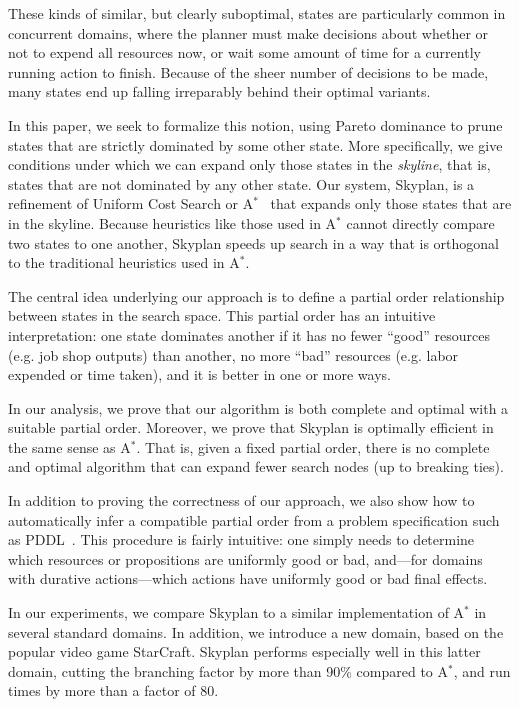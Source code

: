 \documentclass[letterpaper]{article}
\theoremstyle{plain} \newtheorem{theorem}{Theorem} \newtheorem{proposition}{Proposition} \newtheorem{lemma}{Lemma}
\theoremstyle{definition} \newtheorem{definition}{Definition} \newtheorem{conjecture}{Conjecture} \newtheorem*{example}{Example}
\theoremstyle{remark} \newtheorem*{remark}{Remark} \newtheorem*{note}{Note} \newtheorem{case}{Case}
\newcommand{\Astar}{A$^*$ }
\newcommand{\Astarpunct}{A$^*$}
\begin{document}
These kinds of similar, but clearly suboptimal, states are particularly
common in concurrent domains, where the planner must make decisions
about whether or not to expend all resources now, or wait some
amount of time for a currently running action to finish. Because
of the sheer number of decisions to be made, many states
end up falling irreparably behind their optimal variants.

In this paper, we seek to formalize this notion, using Pareto
dominance to prune states that are strictly dominated by some other
state. More specifically, we give conditions under which we can
expand only those states in the \textit{skyline}, that is, states
that are not dominated by any other state. Our system, Skyplan,
is a refinement of Uniform Cost Search or \Astarpunct~\citep{astar} that
expands only those states that are in the skyline. Because heuristics like
those used in \Astar cannot directly compare two states to one another, Skyplan
speeds up search in a way that is orthogonal to the traditional heuristics used in \Astarpunct.

The central idea underlying our approach is to define a partial
order relationship between states in the search space. This partial
order has an intuitive interpretation: one state dominates another
if it has no fewer ``good'' resources (e.g. job shop outputs) than
another, no more ``bad'' resources (e.g. labor expended or time
taken), and it is better in one or more ways. 

In our analysis, we prove that our algorithm is both complete and
optimal with a suitable partial order. Moreover, we prove that
Skyplan is optimally efficient in the same sense as \Astarpunct. That
is, given a fixed partial order, there is no complete and optimal
algorithm that can expand fewer search nodes (up to breaking ties).

In addition to proving the correctness of our approach, we also
show how to automatically infer a compatible partial order from a problem
specification such as PDDL~\citep{ghallab1998pddl,fox2003pddl2}.
This procedure is fairly intuitive: one simply needs to determine
which resources or propositions are uniformly good or bad, and---for 
domains with durative actions---which actions have uniformly
good or bad final effects.

In our experiments, we compare Skyplan to a similar implementation
of \Astar in several standard domains. In addition, we introduce a new
domain, based on the popular video game StarCraft. Skyplan performs
especially well in this latter domain, cutting the branching factor
by more than 90\% compared to \Astarpunct, and run times by more
than a factor of 80.
\end{document}
